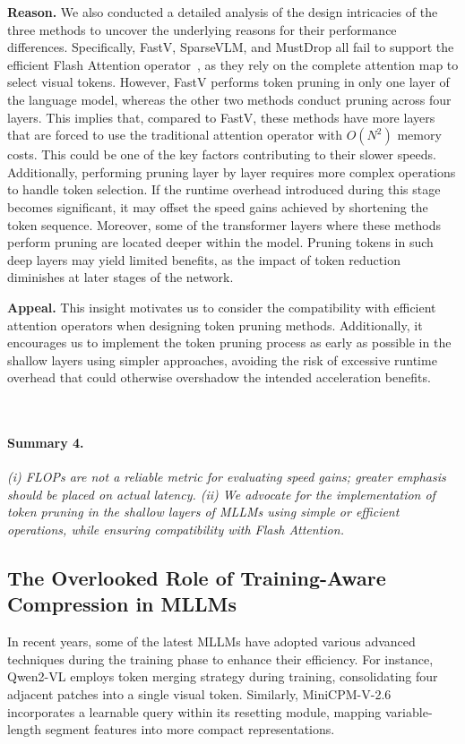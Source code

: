 \noindent\textbf{Reason.} We also conducted a detailed analysis of the design intricacies of the three methods to uncover the underlying reasons for their performance differences. Specifically, FastV, SparseVLM, and MustDrop all fail to support the efficient Flash Attention operator~\citep{dao2022flashattention, dao2023flashattention2}, as they rely on the complete attention map to select visual tokens. However, FastV performs token pruning in only one layer of the language model, whereas the other two methods conduct pruning across four layers. This implies that, compared to FastV, these methods have more layers that are forced to use the traditional attention operator with $O(N^2)$ memory costs. This could be one of the key factors contributing to their slower speeds.
Additionally, performing pruning layer by layer requires more complex operations to handle token selection. If the runtime overhead introduced during this stage becomes significant, it may offset the speed gains achieved by shortening the token sequence. Moreover, some of the transformer layers where these methods perform pruning are located deeper within the model. Pruning tokens in such deep layers may yield limited benefits, as the impact of token reduction diminishes at later stages of the network.

\noindent\textbf{Appeal.} This insight motivates us to consider the compatibility with efficient attention operators when designing token pruning methods. Additionally, it encourages us to implement the token pruning process as early as possible in the shallow layers using simpler approaches, avoiding the risk of excessive runtime overhead that could otherwise overshadow the intended acceleration benefits.
\vspace{-2mm}
\begin{takeaways}
\ \paragraph{Summary 4.} 
    \emph{(i) FLOPs are not a reliable metric for evaluating speed gains; greater emphasis should be placed on actual latency. (ii) We advocate for the implementation of token pruning in the shallow layers of MLLMs using simple or efficient operations, while ensuring compatibility with Flash Attention.}
\end{takeaways}

\subsection{The Overlooked Role of Training-Aware Compression in MLLMs}

In recent years, some of the latest MLLMs have adopted various advanced techniques during the training phase to enhance their efficiency. For instance, Qwen2-VL employs token merging strategy during training, consolidating four adjacent patches into a single visual token. Similarly, MiniCPM-V-2.6 incorporates a learnable query within its resetting module, mapping variable-length segment features into more compact representations.

